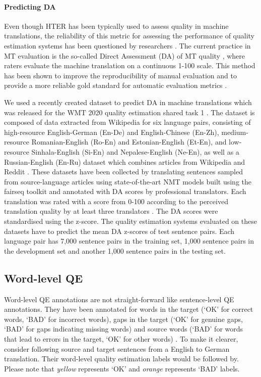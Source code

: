 \paragraph{Predicting DA}
Even though HTER has been typically used to assess quality in machine translations, the reliability of this metric for assessing the performance of quality estimation systems has been questioned by researchers \cite{graham-etal-2016-glitters}. The current practice in MT evaluation is the so-called Direct Assessment (DA) of MT quality \cite{graham_baldwin_moffat_zobel_2017}, where raters evaluate the machine translation on a continuous 1-100 scale. This method has been shown to improve the reproducibility of manual evaluation and to provide a more reliable gold standard for automatic evaluation metrics \cite{graham-etal-2015-accurate}. 

We used a recently created dataset to predict DA in machine translations which was released for the WMT 2020 quality estimation shared task 1 \cite{specia-etal-2020-findings-wmt}. The dataset is composed of data extracted from Wikipedia for six language pairs, consisting of high-resource English-German (En-De) and English-Chinese (En-Zh), medium-resource Romanian-English (Ro-En) and Estonian-English (Et-En), and low-resource Sinhala-English (Si-En) and Nepalese-English (Ne-En), as well as a Russian-English (En-Ru) dataset which combines articles from Wikipedia and Reddit \cite{fomicheva-etal-2020-unsupervised}. These datasets have been collected by translating sentences sampled from source-language articles using state-of-the-art NMT models built using the fairseq toolkit \cite{ott-etal-2019-fairseq} and annotated with DA scores by professional translators. Each translation was rated with a score from 0-100 according to the perceived translation quality by at least three translators \cite{specia-etal-2020-findings-wmt}. The DA scores were standardised using the z-score. The quality estimation systems evaluated on these datasets have to predict the mean DA z-scores of test sentence pairs. Each language pair has 7,000 sentence pairs in the training set, 1,000 sentence pairs in the development set and another 1,000 sentence pairs in the testing set. 

\subsection{Word-level QE}
Word-level QE annotations are not straight-forward like sentence-level QE annotations. They have been annotated for words in the target (`OK' for correct words, `BAD' for incorrect words), gaps in the target (`OK' for genuine gaps, `BAD' for gaps indicating missing words) and source words (`BAD' for words that lead to errors in the target, `OK' for other words) \cite{specia-etal-2018-findings}. To make it clearer, consider following source and target sentences from a English to German translation. Their word-level quality estimation labels would be followed by. Please note that \textit{yellow} represents `OK' and \textit{orange} represents `BAD' labels. 


